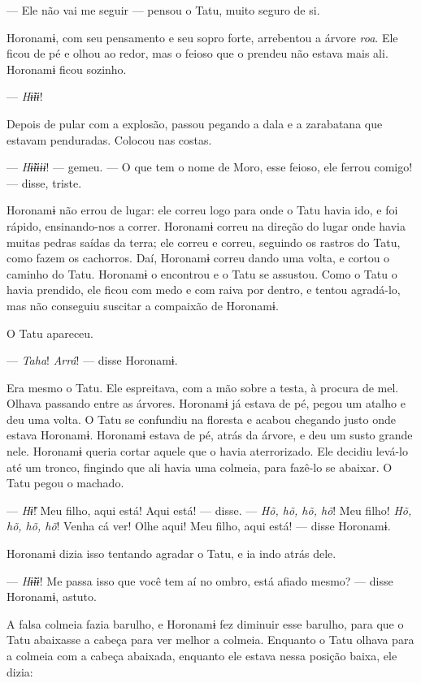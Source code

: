 --- Ele não vai me seguir --- pensou o Tatu, muito seguro de si. 

Horonamɨ, com seu pensamento e seu sopro forte, arrebentou a
árvore \textit{roa}. Ele ficou de pé e olhou ao redor, mas o feioso que o
prendeu não estava mais ali. Horonamɨ ficou sozinho. 

--- \textit{Hɨ̃ɨɨ}! 

Depois de pular com a explosão, passou pegando a dala e a zarabatana que
estavam penduradas. Colocou nas costas. 

--- \textit{Hɨ̃ɨɨɨɨ}! --- gemeu. --- O que tem o nome de Moro, esse feioso,
ele ferrou comigo! --- disse, triste.

Horonamɨ não errou de lugar: ele correu logo para onde o Tatu havia ido,
e foi rápido, ensinando-nos a correr. Horonamɨ correu na direção do
lugar onde havia muitas pedras saídas da terra; ele correu e correu,
seguindo os rastros do Tatu, como fazem os cachorros. Daí, Horonamɨ
correu dando uma volta, e cortou o caminho do Tatu. Horonamɨ o
encontrou e o Tatu se assustou. Como o Tatu o havia prendido, ele ficou
com medo e com raiva por dentro, e tentou agradá-lo, mas não conseguiu
suscitar a compaixão de Horonamɨ. 

O Tatu apareceu.

--- \textit{Taha}! \textit{Arrá}! --- disse Horonamɨ. 

Era mesmo o Tatu. Ele espreitava, com a mão sobre a testa, à procura de
mel. Olhava passando entre as árvores. Horonamɨ já estava de pé, pegou
um atalho e deu uma volta. O Tatu se confundiu na floresta e acabou
chegando justo onde estava Horonamɨ. Horonamɨ estava de pé, atrás da
árvore, e deu um susto grande nele. Horonamɨ queria cortar aquele que o
havia aterrorizado. Ele decidiu levá-lo até um tronco, fingindo que ali
havia uma colmeia, para fazê-lo se abaixar. O Tatu pegou o machado. 

--- \textit{Hɨ̃}! Meu filho, aqui está! Aqui está! --- disse. --- \textit{Hõ, hõ, hõ,
hõ}! Meu filho! \textit{Hõ, hõ, hõ, hõ}! Venha cá ver! Olhe aqui! Meu filho, aqui
está! --- disse Horonamɨ. 

Horonamɨ dizia isso tentando agradar o Tatu, e ia indo atrás dele. 

--- \textit{Hɨ̃ɨɨ}! Me passa isso que você tem aí no ombro, está afiado
mesmo? --- disse Horonamɨ, astuto. 

A falsa colmeia fazia barulho, e Horonamɨ fez diminuir esse barulho,
para que o Tatu abaixasse a cabeça para ver melhor a colmeia. Enquanto o
Tatu olhava para a colmeia com a cabeça abaixada, enquanto ele estava
nessa posição baixa, ele dizia:

